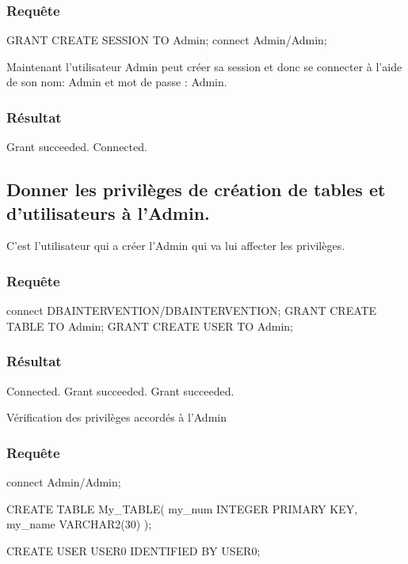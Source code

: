 \documentclass[•]{article}
\begin{document}
\subsubsection{Requête}
\begin{sql}
GRANT CREATE SESSION TO Admin;
connect Admin/Admin;
\end{sql}

\textrm{Maintenant l'utilisateur Admin peut créer sa session et donc se connecter à l'aide de son nom: Admin et mot de passe : Admin.}

\subsubsection{Résultat}
\begin{sql}
Grant succeeded.
Connected.
\end{sql}

\subsection{Donner les privilèges de création de tables et d'utilisateurs à l'Admin.}
\textrm{C'est l'utilisateur qui a créer l'Admin qui va lui affecter les privilèges.}

\subsubsection{Requête}
\begin{sql}
connect DBAINTERVENTION/DBAINTERVENTION;
	GRANT CREATE TABLE TO Admin;
	GRANT CREATE USER TO Admin;
\end{sql}
\subsubsection{Résultat}
\begin{sql}
Connected.
Grant succeeded.
Grant succeeded.
\end{sql}

\textrm{Vérification des privilèges accordés à l'Admin}
\subsubsection{Requête}
\begin{sql}
connect Admin/Admin;
	
	CREATE TABLE My_TABLE(
	my_num INTEGER PRIMARY KEY,
	my_name VARCHAR2(30)
	);
	
	CREATE USER USER0 IDENTIFIED BY USER0;
\end{sql}
\end{document}
